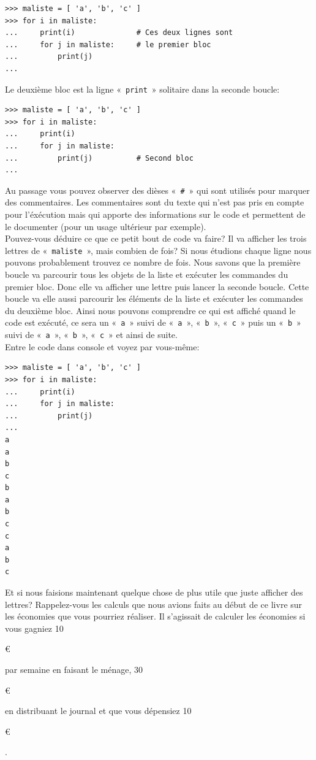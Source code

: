 \begin{Verbatim}[frame=single,rulecolor=\color{gray}, label=ne pas saisir]
>>> maliste = [ 'a', 'b', 'c' ]
>>> for i in maliste:
...     print(i)              # Ces deux lignes sont
...     for j in maliste:     # le premier bloc
...         print(j)
...
\end{Verbatim}

Le deuxième bloc est la ligne « \texttt{print} » solitaire dans la seconde boucle:

\begin{Verbatim}[frame=single,rulecolor=\color{gray}, label=ne pas saisir]
>>> maliste = [ 'a', 'b', 'c' ]
>>> for i in maliste:
...     print(i) 
...     for j in maliste:
...         print(j)          # Second bloc
...
\end{Verbatim}

Au passage vous pouvez observer des dièses « \texttt{\#} » qui sont utilisés pour marquer des commentaires. Les commentaires sont du texte qui n'est pas pris en compte pour l'éxécution mais qui apporte des informations sur le code et permettent de le documenter (pour un usage ultérieur par exemple).\\


Pouvez-vous déduire ce que ce petit bout de code va faire?
Il va afficher les trois lettres de « \texttt{maliste} », mais combien de fois?
Si nous étudions chaque ligne nous pouvons probablement trouvez ce nombre de fois.
Nous savons que la première boucle va parcourir tous les objets de la liste et exécuter
les commandes du premier bloc. Donc elle va afficher une lettre puis lancer la seconde boucle. Cette boucle va elle aussi parcourir les éléments de la liste et exécuter les commandes du deuxième bloc. Ainsi nous pouvons comprendre ce qui est affiché quand le code est exécuté, ce sera un « \texttt{a} »  suivi de « \texttt{a} », « \texttt{b} », « \texttt{c} » puis un « \texttt{b} »  suivi de « \texttt{a} », « \texttt{b} », « \texttt{c} » et ainsi de suite.\\

Entre le code dans console et voyez par vous-même:

\begin{Verbatim}[frame=single,rulecolor=\color{green}, label=à saisir avec attention]
>>> maliste = [ 'a', 'b', 'c' ]
>>> for i in maliste:
...     print(i)
...     for j in maliste:
...         print(j)
...
a
a
b
c
b
a
b
c
c
a
b
c
\end{Verbatim}

Et si nous faisions maintenant quelque chose de plus utile que juste afficher des lettres?
Rappelez-vous les calculs que nous avions faits au début de ce livre sur les économies que vous pourriez réaliser. Il s'agissait de calculer les économies si vous gagniez 10\begin{small}\euro\end{small} par semaine en faisant le ménage, 30\begin{small}\euro\end{small} en distribuant le journal et que vous dépensiez 10\begin{small}\euro\end{small}.\\

